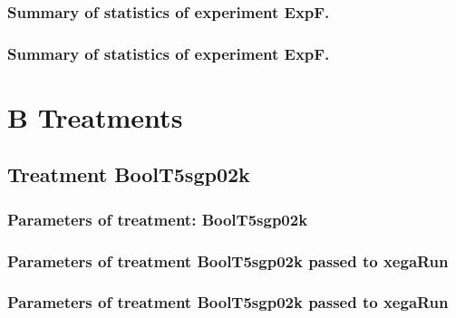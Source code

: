 \documentclass[18pt,c]{beamer}
\makeatletter
\def\beamer@writeslidentry@miniframesoff{%
  \expandafter\beamer@ifempty\expandafter{\beamer@framestartpage}{}%
  {%
   \clearpage\beamer@notesactions%
  }
}
\newcommand*{\miniframesoff}{\let\beamer@writeslidentry=\beamer@writeslidentry@miniframesoff}
\makeatother
\begin{document}
 \begin{frame}
 \fontsize{8pt}{9pt}\selectfont
 \frametitle{ Summary of statistics of experiment ExpF. }

 \label{ExpFStatsTable004.tex}  
 \end{frame}

 \begin{frame}
 \fontsize{8pt}{9pt}\selectfont
 \frametitle{ Summary of statistics of experiment ExpF. }

 \label{ExpFStatsTable005.tex}  
 \end{frame}

\miniframesoff
\section{B Treatments}
\miniframesoff
\subsection{Treatment BoolT5sgp02k}

 \begin{frame}
 \fontsize{8pt}{9pt}\selectfont
 \frametitle{  Parameters of treatment: BoolT5sgp02k 
 }

 \label{ExpFtParmTable000.tex}  
 \end{frame}


 \begin{frame}
 \fontsize{8pt}{9pt}\selectfont
 \frametitle{  Parameters of treatment BoolT5sgp02k passed to xegaRun
 }

 \label{ExpFtParmTable001.tex}  
 \end{frame}


 \begin{frame}
 \fontsize{8pt}{9pt}\selectfont
 \frametitle{  Parameters of treatment BoolT5sgp02k passed to xegaRun
 }

 \label{ExpFtParmTable002.tex}  
 \end{frame}
\end{document}
